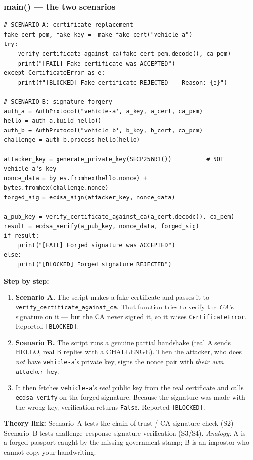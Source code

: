 \documentclass[11pt,a4paper]{report}
\begin{document}
\subsubsection*{main() --- the two scenarios}
\begin{lstlisting}[style=py,caption={mitm\_attack.py --- the two MITM scenarios (key parts).}]
# SCENARIO A: certificate replacement
fake_cert_pem, fake_key = _make_fake_cert("vehicle-a")
try:
    verify_certificate_against_ca(fake_cert_pem.decode(), ca_pem)
    print("[FAIL] Fake certificate was ACCEPTED")
except CertificateError as e:
    print(f"[BLOCKED] Fake certificate REJECTED -- Reason: {e}")

# SCENARIO B: signature forgery
auth_a = AuthProtocol("vehicle-a", a_key, a_cert, ca_pem)
hello = auth_a.build_hello()
auth_b = AuthProtocol("vehicle-b", b_key, b_cert, ca_pem)
challenge = auth_b.process_hello(hello)

attacker_key = generate_private_key(SECP256R1())          # NOT vehicle-a's key
nonce_data = bytes.fromhex(hello.nonce) + bytes.fromhex(challenge.nonce)
forged_sig = ecdsa_sign(attacker_key, nonce_data)

a_pub_key = verify_certificate_against_ca(a_cert.decode(), ca_pem)
result = ecdsa_verify(a_pub_key, nonce_data, forged_sig)
if result:
    print("[FAIL] Forged signature was ACCEPTED")
else:
    print("[BLOCKED] Forged signature REJECTED")
\end{lstlisting}
\textbf{Step by step:}
\begin{enumerate}
  \item \textbf{Scenario A.} The script makes a fake certificate and passes it to
        \texttt{verify\_certificate\_against\_ca}. That function tries to verify
        the \emph{CA}'s signature on it --- but the CA never signed it, so it
        raises \texttt{CertificateError}. Reported \texttt{[BLOCKED]}.
  \item \textbf{Scenario B.} The script runs a genuine partial handshake (real A
        sends HELLO, real B replies with a CHALLENGE). Then the attacker, who
        does \emph{not} have \texttt{vehicle-a}'s private key, signs the nonce
        pair with \emph{their own} \texttt{attacker\_key}.
  \item It then fetches \texttt{vehicle-a}'s \emph{real} public key from the real
        certificate and calls \texttt{ecdsa\_verify} on the forged signature.
        Because the signature was made with the wrong key, verification returns
        \texttt{False}. Reported \texttt{[BLOCKED]}.
\end{enumerate}
\textbf{Theory link:} Scenario~A tests the chain of trust / CA-signature check
(S2); Scenario~B tests challenge--response signature verification (S3/S4).
\emph{Analogy:} A is a forged passport caught by the missing government stamp;
B is an impostor who cannot copy your handwriting.
\end{document}
